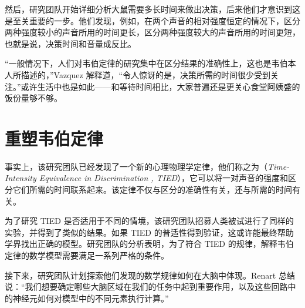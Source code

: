 \begin{multicols}{2}
然后，研究团队开始详细分析大鼠需要多长时间来做出决策，后来他们才意识到这是至关重要的一步。他们发现，例如，在两个声音的相对强度恒定的情况下，区分两种强度较小的声音所用的时间更长，区分两种强度较大的声音所用的时间更短，也就是说，决策时间和音量成反比。

“一般情况下，人们对韦伯定律的研究集中在区分结果的准确性上，这也是韦伯本人所描述的，”Vazquez 解释道，“令人惊讶的是，决策所需的时间很少受到关注。”或许生活中也是如此——和等待时间相比，大家普遍还是更关心食堂阿姨盛的饭份量够不够。

\section*{重塑韦伯定律}

事实上，该研究团队已经发现了一个新的心理物理学定律，他们称之为（\textit{Time-Intensity Equivalence in Discrimination , TIED}），它可以将一对声音的强度和区分它们所需的时间联系起来。该定律不仅与区分的准确性有关，还与所需的时间有关。

为了研究 TIED 是否适用于不同的情境，该研究团队招募人类被试进行了同样的实验，并得到了类似的结果。如果 TIED 的普适性得到验证，这或许能最终帮助学界找出正确的模型。研究团队的分析表明，为了符合 TIED 的规律，解释韦伯定律的数学模型需要满足一系列严格的条件。

接下来，研究团队计划探索他们发现的数学规律如何在大脑中体现。Renart 总结说：“我们想要确定哪些大脑区域在我们的任务中起到重要作用，以及这些回路中的神经元如何对模型中的不同元素执行计算。”

\end{multicols}
\ADhairui
{}
